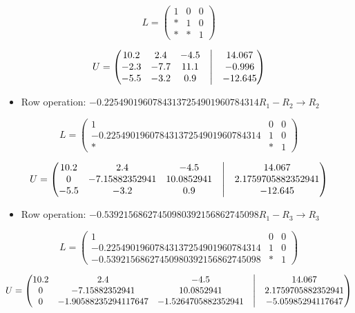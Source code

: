 \documentclass[
]{article}
\providecommand{\tightlist}{%
  \setlength{\itemsep}{0pt}\setlength{\parskip}{0pt}}
\begin{document}
\[
   L = 
   \begin{pmatrix}
    1 & 0 & 0 \\
    * & 1 & 0 \\
    * & * & 1 
   \end{pmatrix}
   \]

\[
   U =
   \begin{pmatrix}
    10.2 & 2.4 & -4.5  &\bigm| & 14.067 \\
    -2.3 & -7.7 & 11.1  &\bigm| & -0.996 \\
    -5.5 & -3.2 & 0.9  &\bigm| & -12.645 
   \end{pmatrix}
   \]

\begin{itemize}
\tightlist
\item
  Row operation:
  \(-0.22549019607843137254901960784314R_{1} - R_{2} \rightarrow R_{2}\)
\end{itemize}

\[
   L = 
   \begin{pmatrix}
    1 & 0 & 0 \\
    -0.22549019607843137254901960784314 & 1 & 0 \\
    * & * & 1 
   \end{pmatrix}
   \]

\[
   U =
   \begin{pmatrix}
    10.2 & 2.4 & -4.5  &\bigm| & 14.067 \\
    0 & -7.15882352941 & 10.0852941  &\bigm| & 2.1759705882352941 \\
    -5.5 & -3.2 & 0.9  &\bigm| & -12.645 
    \end{pmatrix}
   \]

\begin{itemize}
\tightlist
\item
  Row operation:
  \(-0.53921568627450980392156862745098R_{1} - R_{3} \rightarrow R_{3}\)
\end{itemize}

\[
   L = 
   \begin{pmatrix}
    1 & 0 & 0 \\
    -0.22549019607843137254901960784314 & 1 & 0 \\
    -0.53921568627450980392156862745098 & * & 1 
   \end{pmatrix}
   \]

\[
   U =
   \begin{pmatrix}
    10.2 & 2.4 & -4.5  &\bigm| & 14.067 \\
    0 & -7.15882352941 & 10.0852941  &\bigm| & 2.1759705882352941 \\
    0 & -1.90588235294117647 & -1.5264705882352941  &\bigm| & -5.05985294117647 
    \end{pmatrix}
   \]
\end{document}
